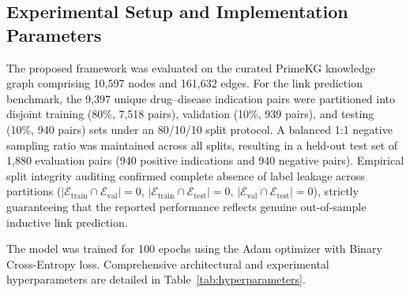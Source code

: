 \documentclass[conference,a4paper]{IEEEtran}
\begin{document}
\subsection{Experimental Setup and Implementation Parameters}
The proposed framework was evaluated on the curated PrimeKG knowledge graph comprising 10,597 nodes and 161,632 edges. For the link prediction benchmark, the 9,397 unique drug--disease indication pairs were partitioned into disjoint training (80\%, 7,518 pairs), validation (10\%, 939 pairs), and testing (10\%, 940 pairs) sets under an 80/10/10 split protocol. A balanced 1:1 negative sampling ratio was maintained across all splits, resulting in a held-out test set of 1,880 evaluation pairs (940 positive indications and 940 negative pairs). Empirical split integrity auditing confirmed complete absence of label leakage across partitions ($|\mathcal{E}_{\mathrm{train}} \cap \mathcal{E}_{\mathrm{val}}| = 0$, $|\mathcal{E}_{\mathrm{train}} \cap \mathcal{E}_{\mathrm{test}}| = 0$, $|\mathcal{E}_{\mathrm{val}} \cap \mathcal{E}_{\mathrm{test}}| = 0$), strictly guaranteeing that the reported performance reflects genuine out-of-sample inductive link prediction.

The model was trained for 100 epochs using the Adam optimizer with Binary Cross-Entropy loss. Comprehensive architectural and experimental hyperparameters are detailed in Table~\ref{tab:hyperparameters}.
\end{document}
